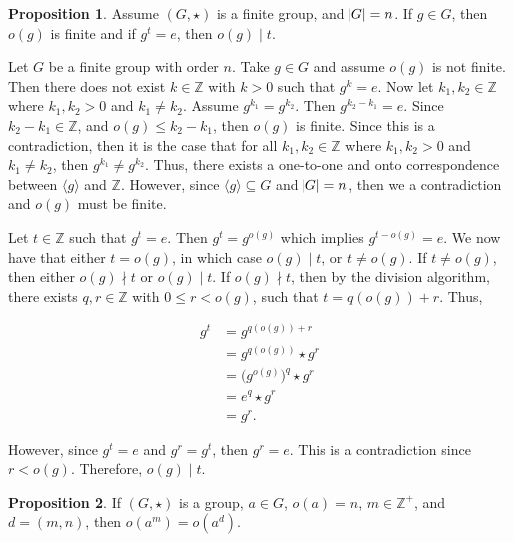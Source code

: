 \documentclass{article}
\makeatletter
\theoremstyle{definition}
\newtheorem{prop}{Proposition}[section]
\theoremstyle{remark}
\let\oldproofname=\proofname
\renewcommand{\proofname}{\bf{\textit{\oldproofname}}}
\theoremstyle{definition}
\renewenvironment{proof}[1][\proofname]{\par
  \pushQED{\qed}%
  \normalfont \topsep6\p@\@plus6\p@\relax
  \list{}{\leftmargin=0mm
          \rightmargin=0mm
          \settowidth{\itemindent}{\itshape#1}%
          \labelwidth=4mm
          \parsep=0pt \listparindent=0mm%
  }
  \item[\hskip\labelsep
        \itshape
    #1\@addpunct{.}]\ignorespaces
}{%
  \popQED\endlist\@endpefalse
}
\makeatother
\begin{document}
\newpage
    \begin{prop}\label{prop:1.4}
        Assume $(G,\star)$ is a finite group, and $\abs{G}=n$. If $g\in G$, then $o(g)$ is finite and if $g^t=e$, then $o(g)\mid t$. 
    \end{prop}
        \begin{proof}
             Let $G$ be a finite group with order $n$. Take $g\in G$ and assume $o(g)$ is not finite. Then there does not exist $k\in\mathbb{Z}$ with $k>0$ such that $g^k=e$. Now let $k_1,k_2\in\mathbb{Z}$ where $k_1,k_2>0$ and $k_1\neq k_2$. Assume $g^{k_1}=g^{k_2}$. Then $g^{k_2-k_1}=e$. Since $k_2-k_1\in\mathbb{Z}$, and $o(g)\leq k_2-k_1$, then $o(g)$ is finite. Since this is a contradiction, then it is the case that for all $k_1,k_2\in\mathbb{Z}$ where $k_1,k_2>0$ and $k_1\neq k_2$, then $g^{k_1}\neq g^{k_2}$. Thus, there exists a one-to-one and onto correspondence between $\langle g\rangle$ and $\mathbb{Z}$. However, since $\langle g\rangle\subseteq G$ and $\abs{G}=n$, then we a contradiction and $o(g)$ must be finite.\par\hspace{4mm} Let $t\in\mathbb{Z}$ such that $g^t=e$. Then $g^t=g^{o(g)}$ which implies $g^{t-o(g)}=e$. We now have that either $t=o(g)$, in which case $o(g)\mid t$, or $t\neq o(g)$. If $t\neq o(g)$, then either $o(g)\nmid t$ or $o(g)\mid t$. If $o(g)\nmid t$, then by the division algorithm, there exists $q,r\in\mathbb{Z}$ with $0\leq r<o(g)$, such that $t=q(o(g))+r$. Thus,
    
            \begin{equation*}
                \begin{split}
                    g^t &= g^{q(o(g))+r} \\
                    &= g^{q(o(g))}\star g^r \\
                    &= \big(g^{o(g)}\big)^q\star g^r \\
                    &= e^q\star g^r \\
                    &= g^r.
                \end{split}
            \end{equation*}
    
            However, since $g^t=e$ and $g^r=g^t$, then $g^r=e$. This is a contradiction since $r<o(g)$. Therefore, $o(g)\mid t$.
        \end{proof}
    \begin{prop}\label{prop:1.5}
        If $(G,\star)$ is a group, $a\in G$, $o(a)=n$, $m\in\mathbb{Z}^{+}$, and $d=(m,n)$, then $o(a^m)=o(a^d)$.
    \end{prop}
\end{document}
